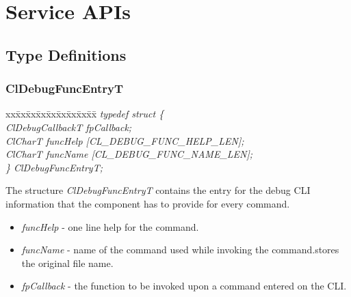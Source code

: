 \chapter{Service APIs}


\section{Type Definitions}

\subsection{ClDebugFuncEntryT}
\begin{tabbing}
xx\=xx\=xx\=xx\=xx\=xx\=xx\=xx\=xx\=\kill
\textit{typedef struct \{}\\
\>\>\>\>\textit{ClDebugCallbackT fpCallback;}\\
\>\>\>\>\textit{ClCharT funcHelp \mbox{[}CL\_DEBUG\_FUNC\_HELP\_LEN\mbox{]};}\\
\>\>\>\>\textit{ClCharT funcName \mbox{[}CL\_DEBUG\_FUNC\_NAME\_LEN\mbox{]};}\\
\textit{\} ClDebugFuncEntryT;}\end{tabbing}
The structure \textit{ClDebugFuncEntryT} contains the entry for the debug CLI information that the component has to provide for every command.
\begin{itemize}
\item
\textit{funcHelp} - one line help for the command.
\item
\textit{funcName} - name of the command used while invoking the command.stores the
original file name.
\item \textit{fpCallback} - the function to be invoked upon a command entered on the CLI.
\end{itemize}


